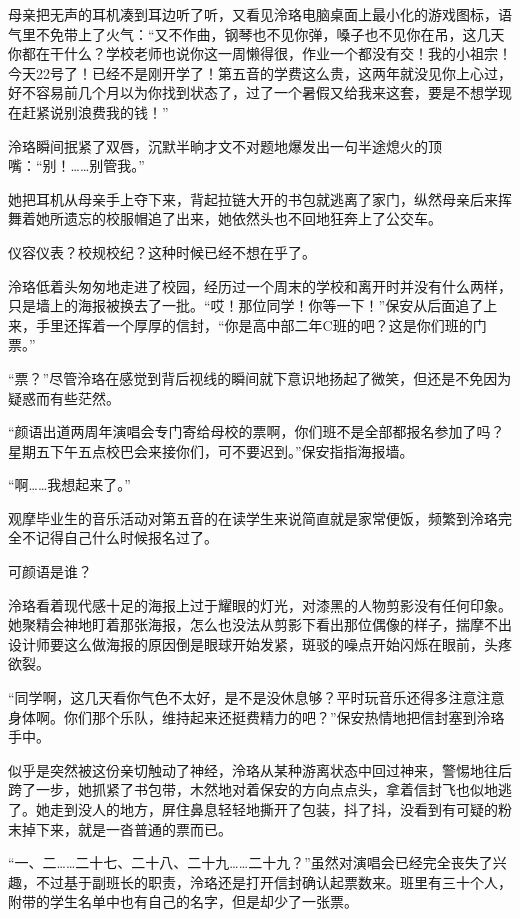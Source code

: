 \documentclass[UTF8, scheme = chinese, openany]{ctexbook}
\begin{document}
母亲把无声的耳机凑到耳边听了听，又看见泠珞电脑桌面上最小化的游戏图标，语气里不免带上了火气：“又不作曲，钢琴也不见你弹，嗓子也不见你在吊，这几天你都在干什么？学校老师也说你这一周懒得很，作业一个都没有交！我的小祖宗！今天22号了！已经不是刚开学了！第五音的学费这么贵，这两年就没见你上心过，好不容易前几个月以为你找到状态了，过了一个暑假又给我来这套，要是不想学现在赶紧说别浪费我的钱！”

泠珞瞬间抿紧了双唇，沉默半晌才文不对题地爆发出一句半途熄火的顶嘴：“别！……别管我。”

她把耳机从母亲手上夺下来，背起拉链大开的书包就逃离了家门，纵然母亲后来挥舞着她所遗忘的校服帽追了出来，她依然头也不回地狂奔上了公交车。

仪容仪表？校规校纪？这种时候已经不想在乎了。

泠珞低着头匆匆地走进了校园，经历过一个周末的学校和离开时并没有什么两样，只是墙上的海报被换去了一批。“哎！那位同学！你等一下！”保安从后面追了上来，手里还挥着一个厚厚的信封，“你是高中部二年C班的吧？这是你们班的门票。”

“票？”尽管泠珞在感觉到背后视线的瞬间就下意识地扬起了微笑，但还是不免因为疑惑而有些茫然。

“颜语出道两周年演唱会专门寄给母校的票啊，你们班不是全部都报名参加了吗？星期五下午五点校巴会来接你们，可不要迟到。”保安指指海报墙。

“啊……我想起来了。”

观摩毕业生的音乐活动对第五音的在读学生来说简直就是家常便饭，频繁到泠珞完全不记得自己什么时候报名过了。

可颜语是谁？

泠珞看着现代感十足的海报上过于耀眼的灯光，对漆黑的人物剪影没有任何印象。她聚精会神地盯着那张海报，怎么也没法从剪影下看出那位偶像的样子，揣摩不出设计师要这么做海报的原因倒是眼球开始发紧，斑驳的噪点开始闪烁在眼前，头疼欲裂。

“同学啊，这几天看你气色不太好，是不是没休息够？平时玩音乐还得多注意注意身体啊。你们那个乐队，维持起来还挺费精力的吧？”保安热情地把信封塞到泠珞手中。

似乎是突然被这份亲切触动了神经，泠珞从某种游离状态中回过神来，警惕地往后跨了一步，她抓紧了书包带，木然地对着保安的方向点点头，拿着信封飞也似地逃了。她走到没人的地方，屏住鼻息轻轻地撕开了包装，抖了抖，没看到有可疑的粉末掉下来，就是一沓普通的票而已。

“一、二……二十七、二十八、二十九……二十九？”虽然对演唱会已经完全丧失了兴趣，不过基于副班长的职责，泠珞还是打开信封确认起票数来。班里有三十个人，附带的学生名单中也有自己的名字，但是却少了一张票。
\end{document}
